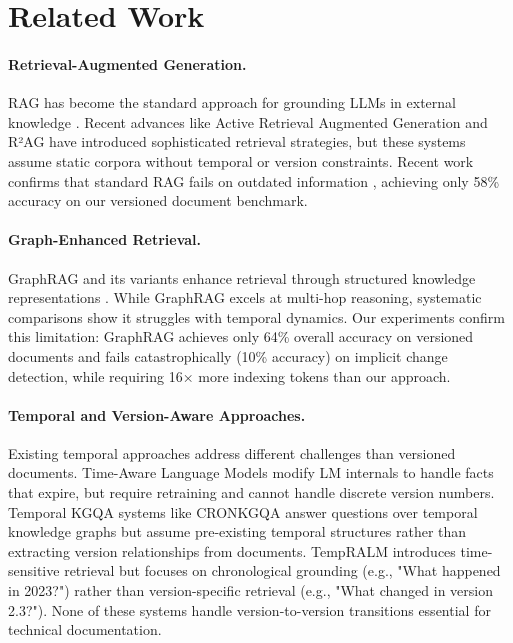 \section{Related Work}

\paragraph{Retrieval-Augmented Generation.}
RAG has become the standard approach for grounding LLMs in external knowledge \cite{lewis2021retrievalaugmentedgenerationknowledgeintensivenlp,gao2023retrieval}. Recent advances like Active Retrieval Augmented Generation \cite{jiang2023active} and R²AG \cite{ye2024r2ag} have introduced sophisticated retrieval strategies, but these systems assume static corpora without temporal or version constraints. Recent work confirms that standard RAG fails on outdated information \cite{ouyang2025hohdynamicbenchmarkevaluating}, achieving only 58\% accuracy on our versioned document benchmark.

\paragraph{Graph-Enhanced Retrieval.}
GraphRAG and its variants enhance retrieval through structured knowledge representations \cite{zhang2025surveygraphretrievalaugmentedgeneration}. While GraphRAG excels at multi-hop reasoning, systematic comparisons \cite{han2025ragvsgraphragsystematic} show it struggles with temporal dynamics. Our experiments confirm this limitation: GraphRAG achieves only 64\% overall accuracy on versioned documents and fails catastrophically (10\% accuracy) on implicit change detection, while requiring 16× more indexing tokens than our approach.

\paragraph{Temporal and Version-Aware Approaches.}
Existing temporal approaches address different challenges than versioned documents. Time-Aware Language Models \cite{dhingra2022timeaware} modify LM internals to handle facts that expire, but require retraining and cannot handle discrete version numbers. Temporal KGQA systems like CRONKGQA \cite{saxena2021temporal} answer questions over temporal knowledge graphs but assume pre-existing temporal structures rather than extracting version relationships from documents. TempRALM \cite{gade2024itstimeincorporatingtemporality} introduces time-sensitive retrieval but focuses on chronological grounding (e.g., "What happened in 2023?") rather than version-specific retrieval (e.g., "What changed in version 2.3?"). None of these systems handle version-to-version transitions essential for technical documentation.


